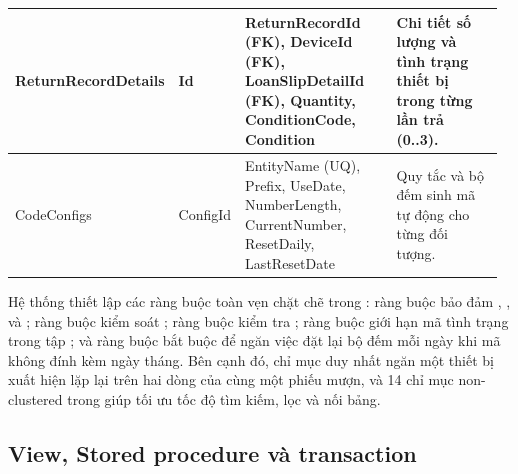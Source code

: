{\begin{longtable}{|>{\raggedright\arraybackslash}p{0.114\linewidth}|>{\raggedright\arraybackslash}p{0.133\linewidth}|>{\raggedright\arraybackslash}p{0.361\linewidth}|>{\raggedright\arraybackslash}p{0.361\linewidth}|}
ReturnRecordDetails & Id & ReturnRecordId (FK), DeviceId (FK), LoanSlipDetailId (FK), Quantity, ConditionCode, Condition & Chi tiết số lượng và tình trạng thiết bị trong từng lần trả (0..3). \\ \hline
CodeConfigs & ConfigId & EntityName (UQ), Prefix, UseDate, NumberLength, CurrentNumber, ResetDaily, LastResetDate & Quy tắc và bộ đếm sinh mã tự động cho từng đối tượng. \\ \hline
\end{longtable}
}

Hệ thống thiết lập các ràng buộc toàn vẹn chặt chẽ trong : ràng buộc  bảo đảm , ,  và ; ràng buộc  kiểm soát ; ràng buộc  kiểm tra ; ràng buộc  giới hạn mã tình trạng trong tập ; và ràng buộc  bắt buộc  để ngăn việc đặt lại bộ đếm mỗi ngày khi mã không đính kèm ngày tháng. Bên cạnh đó, chỉ mục duy nhất  ngăn một thiết bị xuất hiện lặp lại trên hai dòng của cùng một phiếu mượn, và 14 chỉ mục non-clustered trong  giúp tối ưu tốc độ tìm kiếm, lọc và nối bảng.


\subsection{View, Stored procedure và transaction}

